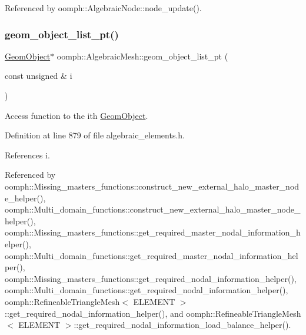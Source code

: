 Referenced by oomph\+::\+Algebraic\+Node\+::node\+\_\+update().

\mbox{\label{classoomph_1_1AlgebraicMesh_aad2902d3afa811449f484d3174f19a5e}} 
\subsubsection{\texorpdfstring{geom\+\_\+object\+\_\+list\+\_\+pt()}{geom\_object\_list\_pt()}}
{\footnotesize\ttfamily \hyperlink{classoomph_1_1GeomObject}{Geom\+Object}$\ast$ oomph\+::\+Algebraic\+Mesh\+::geom\+\_\+object\+\_\+list\+\_\+pt (\begin{DoxyParamCaption}\item[{const unsigned \&}]{i }\end{DoxyParamCaption})\hspace{0.3cm}{\ttfamily [inline]}}



Access function to the ith \hyperlink{classoomph_1_1GeomObject}{Geom\+Object}. 



Definition at line 879 of file algebraic\+\_\+elements.\+h.



References i.



Referenced by oomph\+::\+Missing\+\_\+masters\+\_\+functions\+::construct\+\_\+new\+\_\+external\+\_\+halo\+\_\+master\+\_\+node\+\_\+helper(), oomph\+::\+Multi\+\_\+domain\+\_\+functions\+::construct\+\_\+new\+\_\+external\+\_\+halo\+\_\+master\+\_\+node\+\_\+helper(), oomph\+::\+Missing\+\_\+masters\+\_\+functions\+::get\+\_\+required\+\_\+master\+\_\+nodal\+\_\+information\+\_\+helper(), oomph\+::\+Multi\+\_\+domain\+\_\+functions\+::get\+\_\+required\+\_\+master\+\_\+nodal\+\_\+information\+\_\+helper(), oomph\+::\+Missing\+\_\+masters\+\_\+functions\+::get\+\_\+required\+\_\+nodal\+\_\+information\+\_\+helper(), oomph\+::\+Multi\+\_\+domain\+\_\+functions\+::get\+\_\+required\+\_\+nodal\+\_\+information\+\_\+helper(), oomph\+::\+Refineable\+Triangle\+Mesh$<$ E\+L\+E\+M\+E\+N\+T $>$\+::get\+\_\+required\+\_\+nodal\+\_\+information\+\_\+helper(), and oomph\+::\+Refineable\+Triangle\+Mesh$<$ E\+L\+E\+M\+E\+N\+T $>$\+::get\+\_\+required\+\_\+nodal\+\_\+information\+\_\+load\+\_\+balance\+\_\+helper().

